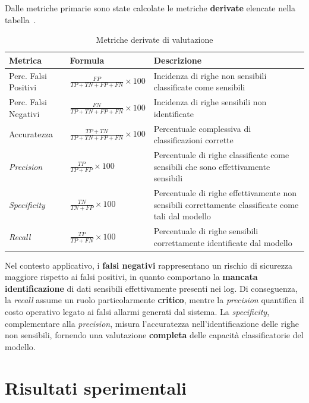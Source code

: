 \documentclass[12pt,twoside]{report}
\begin{document}
Dalle metriche primarie sono state calcolate le metriche \textbf{derivate} elencate nella tabella~.

\begin{table}[h!]
    \centering
    \begin{tabular}{|p{}|p{}|p{}|}
        \hline
        \textbf{Metrica} & \textbf{Formula} & \textbf{Descrizione} \\
        \hline
        Perc. Falsi Positivi & $\frac{FP}{TP + TN + FP + FN} \times 100$ & Incidenza di righe non sensibili classificate come sensibili \\
        \hline
        Perc. Falsi Negativi & $\frac{FN}{TP + TN + FP + FN} \times 100$ & Incidenza di righe sensibili non identificate \\
        \hline
        Accuratezza & $\frac{TP + TN}{TP + TN + FP + FN} \times 100$ & Percentuale complessiva di classificazioni corrette \\
        \hline
        \textit{Precision} & $\frac{TP}{TP + FP} \times 100$ & Percentuale di righe classificate come sensibili che sono effettivamente sensibili \\
        \hline
        \textit{Specificity} & $\frac{TN}{TN + FP} \times 100$ & Percentuale di righe effettivamente non sensibili correttamente classificate come tali dal modello \\
        \hline
        \textit{Recall} & $\frac{TP}{TP + FN} \times 100$ & Percentuale di righe sensibili correttamente identificate dal modello \\
        \hline
    \end{tabular}
    \caption{Metriche derivate di valutazione}
    \label{tab:metriche_derivate}
\end{table}

Nel contesto applicativo, i \textbf{falsi negativi} rappresentano un rischio di sicurezza maggiore rispetto ai falsi positivi, in quanto comportano la \textbf{mancata identificazione} di dati sensibili effettivamente presenti nei log. Di conseguenza, la \textit{recall} assume un ruolo particolarmente \textbf{critico}, mentre la \textit{precision} quantifica il costo operativo legato ai falsi allarmi generati dal sistema. La \textit{specificity}, complementare alla \textit{precision}, misura l'accuratezza nell'identificazione delle righe non sensibili, fornendo una valutazione \textbf{completa} delle capacità classificatorie del modello.

\section{Risultati sperimentali}
\label{sec:risultati_sperimentali}
\end{document}
